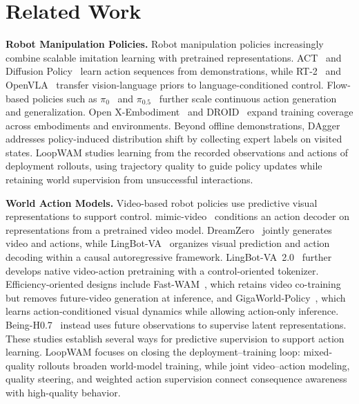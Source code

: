 \section{Related Work}
\label{sec:related_work}

\textbf{Robot Manipulation Policies.}
Robot manipulation policies increasingly combine scalable imitation learning with pretrained representations.
ACT~\citep{zhao2023learning} and Diffusion Policy~\citep{chi2025diffusion} learn action sequences from demonstrations, while RT-2~\citep{zitkovich2023rt2} and OpenVLA~\citep{kim2024openvla} transfer vision-language priors to language-conditioned control.
Flow-based policies such as $\pi_0$~\citep{black2024pi0} and $\pi_{0.5}$~\citep{physicalintelligence2025pi05} further scale continuous action generation and generalization.
Open X-Embodiment~\citep{o2024open} and DROID~\citep{khazatsky2024droid} expand training coverage across embodiments and environments.
Beyond offline demonstrations, DAgger~\citep{ross2011dagger} addresses policy-induced distribution shift by collecting expert labels on visited states.
LoopWAM studies learning from the recorded observations and actions of deployment rollouts, using trajectory quality to guide policy updates while retaining world supervision from unsuccessful interactions.

\textbf{World Action Models.}
Video-based robot policies use predictive visual representations to support control.
mimic-video~\citep{pai2025mimicvideo} conditions an action decoder on representations from a pretrained video model.
DreamZero~\citep{ye2026world} jointly generates video and actions, while LingBot-VA~\citep{lingbot-va2026} organizes visual prediction and action decoding within a causal autoregressive framework.
LingBot-VA~2.0~\citep{zhang2026lingbotva2} further develops native video-action pretraining with a control-oriented tokenizer.
Efficiency-oriented designs include Fast-WAM~\citep{yuan2026fast}, which retains video co-training but removes future-video generation at inference, and GigaWorld-Policy~\citep{ye2026gigaworld}, which learns action-conditioned visual dynamics while allowing action-only inference.
Being-H0.7~\citep{luo2026beingh07} instead uses future observations to supervise latent representations.
These studies establish several ways for predictive supervision to support action learning.
LoopWAM focuses on closing the deployment--training loop: mixed-quality rollouts broaden world-model training, while joint video--action modeling, quality steering, and weighted action supervision connect consequence awareness with high-quality behavior.

